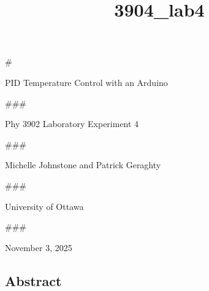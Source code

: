 \documentclass[11pt]{article}
\title{3904\_lab4}
\begin{document}
    
    \maketitle
    
    

    
    \#

PID Temperature Control with an Arduino

    

    

    

    

    

    

    

    

    

    

    

    

    

    \#\#\#

Phy 3902 Laboratory Experiment 4

    

    

    

    

    

    

    

    

    

    

    

    

    

    \#\#\#

Michelle Johnstone and Patrick Geraghty

    \#\#\#

University of Ottawa

    \#\#\#

November 3, 2025

    \hypertarget{abstract}{%
\subsection{Abstract}\label{abstract}}
\end{document}
